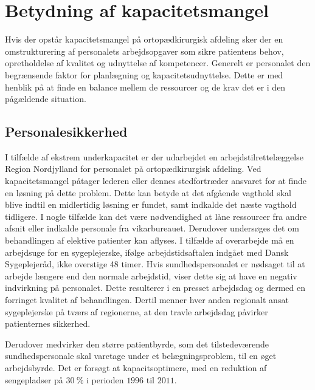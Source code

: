 \section{Betydning af kapacitetsmangel}
Hvis der opstår kapacitetsmangel på ortopædkirurgisk afdeling sker der en omstrukturering af personalets arbejdsopgaver som sikre patientens behov, opretholdelse af kvalitet og udnyttelse af kompetencer. Generelt er personalet den begrænsende faktor for planlægning og kapacitetsudnyttelse\cite{Company2013}. Dette er med henblik på at finde en balance mellem de ressourcer og de krav det er i den pågældende situation. \cite{Bjerg2016} 

\subsection{Personalesikkerhed} \label{Per_sik}

I tilfælde af ekstrem underkapacitet er der udarbejdet en arbejdstilrettelæggelse Region Nordjylland for personalet på ortopædkirurgisk afdeling. Ved kapacitetsmangel påtager lederen eller dennes stedfortræder ansvaret for at finde en løsning på dette problem. Dette kan betyde at det afgående vagthold skal blive indtil en midlertidig løsning er fundet, samt indkalde det næste vagthold tidligere. I nogle tilfælde kan det være nødvendighed at låne ressourcer fra andre afsnit eller indkalde personale fra vikarbureauet. Derudover undersøges det om behandlingen af elektive patienter kan aflyses.\cite{Bjerg2016} I tilfælde af overarbejde må en arbejdsuge for en sygeplejerske, ifølge arbejdstidsaftalen indgået med Dansk Sygeplejeråd, ikke overstige 48 timer\cite{Danske2015}.   Hvis sundhedspersonalet er nødsaget til at arbejde længere end den normale arbejdstid, viser dette sig at have en negativ indvirkning på personalet.\cite{Dinges2004} Dette resulterer i en presset arbejdsdag og dermed en forringet kvalitet af behandlingen. Dertil menner hver anden regionalt ansat sygeplejerske på tværs af regionerne, at den travle arbejdsdag påvirker patienternes sikkerhed.\cite{Kjeldsen2015} 

Derudover medvirker den større patientbyrde, som det tilstedeværende sundhedspersonale skal varetage under et belægningsproblem, til en øget arbejdsbyrde.  Det er forsøgt at kapacitsoptimere, med en reduktion af sengepladser på $30~\%$ i perioden $1996$ til $2011$.\cite{Dinges2004,Aiken2002,Madsen2014} 



